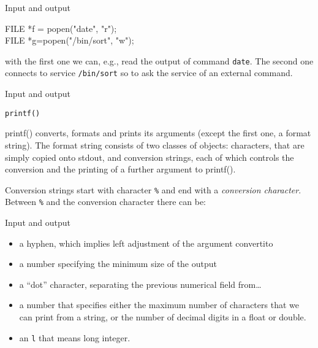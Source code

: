 \begin{frame}[fragile]{Input and output}
\begin{center}
FILE *f = popen("date", "r");\\
FILE *g=popen("/bin/sort", "w");
\end{center}

\vspace{20pt}

with the first one we can, e.g., read the output of command \verb"date".
The second one connects to service \verb"/bin/sort" so to
ask the service of an external command.



\end{frame}
\begin{frame}[fragile]{Input and output}
\begin{center}\tt printf() \end{center}

printf() converts, formats and prints its arguments (except the
first one, a format string).
The format string consists of two classes of objects:
characters, that are simply copied onto stdout, and
conversion strings, each of which controls the conversion and
the printing of a further argument to printf().


\vspace{20pt}

Conversion strings start with
character {\tt \%} and end with a 
{\em conversion character\/}. Between {\tt \%} and the conversion character
there can be:

\end{frame}
\begin{frame}[fragile]{Input and output}
\begin{itemize}
\item a hyphen, which implies left adjustment of the argument
convertito
\item a number specifying the minimum size of the output
\item a ``dot'' character, separating the previous numerical field from\ldots
\item a number that specifies either the maximum number of
characters that we can print from a string, or the number of decimal digits
in a float or double.
\item an {\tt l} that means long integer.
\end{itemize}


\end{frame}
